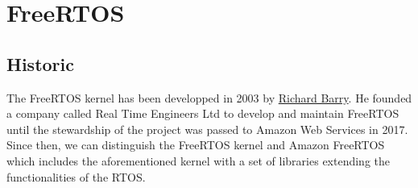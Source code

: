 \section{FreeRTOS}

\subsection{Historic}
The FreeRTOS kernel has been developped in 2003 by \href{https://www.linkedin.com/in/richard-barry-4562262/}{Richard Barry}. %
He founded a company called Real Time Engineers Ltd to develop and maintain FreeRTOS until the stewardship of the project was passed to Amazon Web Services in 2017.
Since then, we can distinguish the FreeRTOS kernel and Amazon FreeRTOS which includes the aforementioned kernel with a set of libraries extending the functionalities of the RTOS.